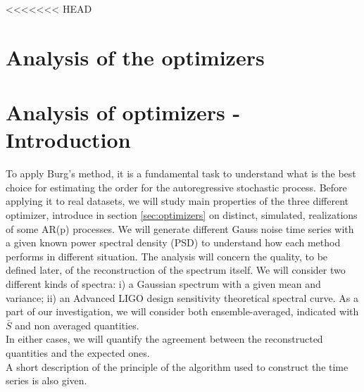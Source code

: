 \documentclass[twocolumn,showpacs,preprintnumbers,nofootinbib,prd,
superscriptaddress,10pt]{revtex4-1}
\begin{document}
<<<<<<< HEAD
\section{Analysis of the optimizers}
 \section{Analysis of optimizers - Introduction}
To apply Burg's method, it is a fundamental task to understand what is the best choice for estimating the order for the autoregressive stochastic process. Before applying it to real datasets, we will study main properties of the three different optimizer, introduce in section \ref{sec:optimizers} on distinct, simulated, realizations of some AR(p) processes. We will generate different Gauss noise time series with a given known power spectral density (PSD) to understand how each method performs in different situation. The analysis will concern the quality, to be defined later, of the reconstruction of the spectrum itself. We will consider two different kinds of spectra: i) a Gaussian spectrum with a given mean and variance; ii) an Advanced LIGO design sensitivity theoretical spectral curve.  As a part of our investigation, we will consider both ensemble-averaged, indicated with $\bar S$ and non averaged quantities. \\ 
In either cases, we will quantify the agreement between the reconstructed quantities and the expected ones.\\
A short description of the principle of the algorithm used to construct the time series is also given. 
\end{document}
